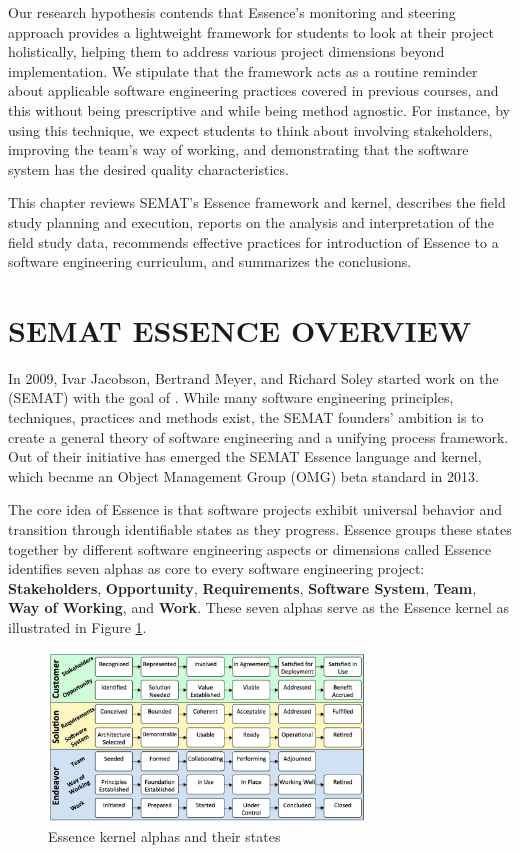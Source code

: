 Our research hypothesis contends that Essence's monitoring and steering approach provides a lightweight framework for students to look at their project holistically, helping them to address various project dimensions beyond implementation. We stipulate that the framework acts as a routine reminder about applicable software engineering practices covered in previous courses, and this without being prescriptive and while being method agnostic. For instance, by using this technique, we expect students to think about involving stakeholders, improving the team's way of working, and demonstrating that the software system has the desired quality characteristics.

This chapter reviews SEMAT's Essence framework and kernel, describes the field study planning and execution, reports on the analysis and interpretation of the field study data, recommends effective practices for introduction of Essence to a software engineering curriculum, and summarizes the conclusions.

\section{SEMAT ESSENCE OVERVIEW}
In 2009, Ivar Jacobson, Bertrand Meyer, and Richard Soley started work on the  (SEMAT) with the goal of  \cite{JacobsonCallForAction}. While many software engineering principles, techniques, practices and methods exist, the SEMAT founders' ambition is to create a general theory of software engineering and a unifying process framework. Out of their initiative has emerged the SEMAT Essence language and kernel, which became an Object Management Group (OMG) beta standard in 2013.

The core idea of Essence is that software projects exhibit universal behavior and transition through identifiable states as they progress. Essence groups these states together by different software engineering aspects or dimensions called  Essence identifies seven alphas as core to every software engineering project: \textbf{Stakeholders}, \textbf{Opportunity}, \textbf{Requirements}, \textbf{Software System}, \textbf{Team}, \textbf{Way of Working}, and \textbf{Work}. These seven alphas serve as the Essence kernel as illustrated in Figure \ref{EssenceKernel}.

\begin{figure}[h]
\centering
\includegraphics[width=3.30in]{project_steering_images/EssenceKernel.png}
\caption{Essence kernel alphas and their states }
\label{EssenceKernel}
\end{figure}

